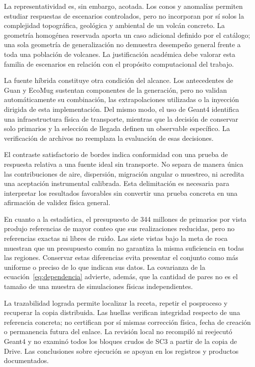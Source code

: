 \documentclass[11pt,a4paper]{article}
\begin{document}
La representatividad es, sin embargo, acotada. Los conos y anomalías permiten estudiar respuestas de escenarios controlados, pero no incorporan por sí solos la complejidad topográfica, geológica y ambiental de un volcán concreto. La geometría homogénea reservada aporta un caso adicional definido por el catálogo; una sola geometría de generalización no demuestra desempeño general frente a toda una población de volcanes. La justificación académica debe valorar esta familia de escenarios en relación con el propósito computacional del trabajo.

La fuente híbrida constituye otra condición del alcance. Los antecedentes de Guan y EcoMug sustentan componentes de la generación, pero no validan automáticamente su combinación, las extrapolaciones utilizadas o la inyección dirigida de esta implementación. Del mismo modo, el uso de Geant4 identifica una infraestructura física de transporte, mientras que la decisión de conservar solo primarios y la selección de llegada definen un observable específico. La verificación de archivos no reemplaza la evaluación de esas decisiones.

El contraste satisfactorio de bordes indica conformidad con una prueba de respuesta relativa a una fuente ideal sin transporte. No separa de manera única las contribuciones de aire, dispersión, migración angular o muestreo, ni acredita una aceptación instrumental calibrada. Esta delimitación es necesaria para interpretar los resultados favorables sin convertir una prueba concreta en una afirmación de validez física general.

En cuanto a la estadística, el presupuesto de 344 millones de primarios por vista produjo referencias de mayor conteo que sus realizaciones reducidas, pero no referencias exactas ni libres de ruido. Las siete vistas bajo la meta de roca muestran que un presupuesto común no garantiza la misma suficiencia en todas las regiones. Conservar estas diferencias evita presentar el conjunto como más uniforme o preciso de lo que indican sus datos. La covarianza de la ecuación~\eqref{eq:dependencia} advierte, además, que la cantidad de pares no es el tamaño de una muestra de simulaciones físicas independientes.

La trazabilidad lograda permite localizar la receta, repetir el posproceso y recuperar la copia distribuida. Las huellas verifican integridad respecto de una referencia concreta; no certifican por sí mismas corrección física, fecha de creación o permanencia futura del enlace. La revisión local no recompiló ni reejecutó Geant4 y no examinó todos los bloques crudos de SC3 a partir de la copia de Drive. Las conclusiones sobre ejecución se apoyan en los registros y productos documentados.
\end{document}
